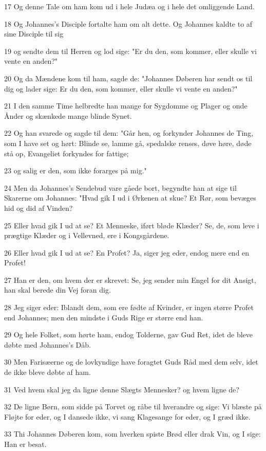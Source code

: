 \par 17 Og denne Tale om ham kom ud i hele Judæa og i hele det omliggende Land.
\par 18 Og Johannes's Disciple fortalte ham om alt dette. Og Johannes kaldte to af sine Disciple til sig
\par 19 og sendte dem til Herren og lod sige: "Er du den, som kommer, eller skulle vi vente en anden?"
\par 20 Og da Mændene kom til ham, sagde de: "Johannes Døberen har sendt os til dig og lader sige: Er du den, som kommer, eller skulle vi vente en anden?"
\par 21 I den samme Time helbredte han mange for Sygdomme og Plager og onde Ånder og skænkede mange blinde Synet.
\par 22 Og han svarede og sagde til dem: "Går hen, og forkynder Johannes de Ting, som I have set og hørt: Blinde se, lamme gå, spedalske renses, døve høre, døde stå op, Evangeliet forkyndes for fattige;
\par 23 og salig er den, som ikke forarges på mig."
\par 24 Men da Johannes's Sendebud vare gåede bort, begyndte han at sige til Skarerne om Johannes: "Hvad gik I ud i Ørkenen at skue? Et Rør, som bevæges hid og did af Vinden?
\par 25 Eller hvad gik I ud at se? Et Menneske, iført bløde Klæder? Se, de, som leve i prægtige Klæder og i Vellevned, ere i Kongsgårdene.
\par 26 Eller hvad gik I ud at se? En Profet? Ja, siger jeg eder, endog mere end en Profet!
\par 27 Han er den, om hvem der er skrevet: Se, jeg sender min Engel for dit Ansigt, han skal berede din Vej foran dig.
\par 28 Jeg siger eder: Iblandt dem, som ere fødte af Kvinder, er ingen større Profet end Johannes; men den mindste i Guds Rige er større end han.
\par 29 Og hele Folket, som hørte ham, endog Tolderne, gav Gud Ret, idet de bleve døbte med Johannes's Dåb.
\par 30 Men Farisæerne og de lovkyndige have foragtet Guds Råd med dem selv, idet de ikke bleve døbte af ham.
\par 31 Ved hvem skal jeg da ligne denne Slægts Mennesker? og hvem ligne de?
\par 32 De ligne Børn, som sidde på Torvet og råbe til hverandre og sige: Vi blæste på Fløjte for eder, og I dansede ikke, vi sang Klagesange for eder, og I græd ikke.
\par 33 Thi Johannes Døberen kom, som hverken spiste Brød eller drak Vin, og I sige: Han er besat.
